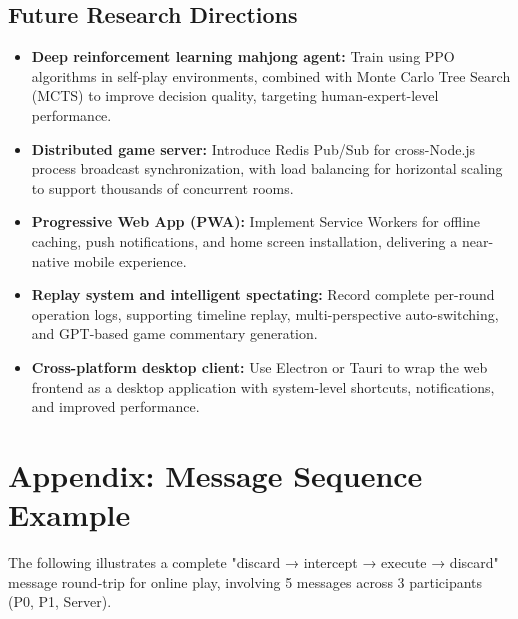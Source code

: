 \documentclass[11pt,a4paper]{article}
\begin{document}
\subsection{Future Research Directions}

\begin{itemize}[nosep]
  \item \textbf{Deep reinforcement learning mahjong agent:} Train using PPO algorithms in self-play environments, combined with Monte Carlo Tree Search (MCTS) to improve decision quality, targeting human-expert-level performance.
  \item \textbf{Distributed game server:} Introduce Redis Pub/Sub for cross-Node.js process broadcast synchronization, with load balancing for horizontal scaling to support thousands of concurrent rooms.
  \item \textbf{Progressive Web App (PWA):} Implement Service Workers for offline caching, push notifications, and home screen installation, delivering a near-native mobile experience.
  \item \textbf{Replay system and intelligent spectating:} Record complete per-round operation logs, supporting timeline replay, multi-perspective auto-switching, and GPT-based game commentary generation.
  \item \textbf{Cross-platform desktop client:} Use Electron or Tauri to wrap the web frontend as a desktop application with system-level shortcuts, notifications, and improved performance.
\end{itemize}

\section*{Appendix: Message Sequence Example}

The following illustrates a complete "discard → intercept → execute → discard" message round-trip for online play, involving 5 messages across 3 participants (P0, P1, Server).
\end{document}
